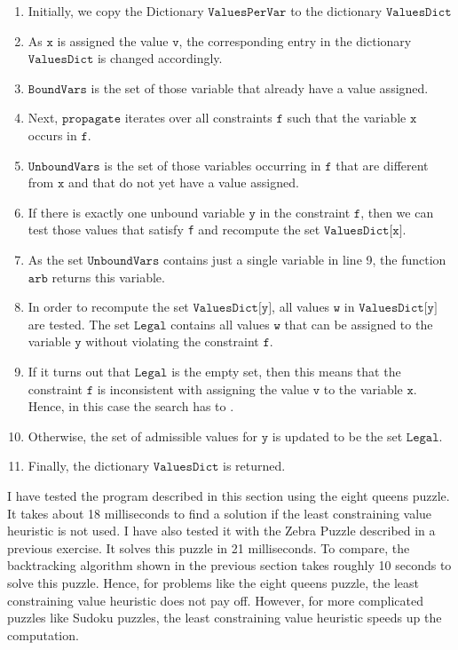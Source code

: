 \begin{enumerate}
\item Initially, we copy the Dictionary $\texttt{ValuesPerVar}$ to the dictionary
      $\mathtt{ValuesDict}$
\item As $\texttt{x}$ is assigned the value $\texttt{v}$, the corresponding entry in the dictionary
      $\texttt{ValuesDict}$ is changed accordingly. 
\item $\texttt{BoundVars}$ is the set of those variable that already have a value assigned.
\item Next, $\texttt{propagate}$ iterates over all  constraints $\texttt{f}$ such that the variable
      $\texttt{x}$ occurs in $\texttt{f}$.
\item $\texttt{UnboundVars}$ is the set of those variables occurring in $\texttt{f}$ that are different from
      $\texttt{x}$ and that do not yet have a value assigned.  
\item If there is exactly one unbound variable $\texttt{y}$ in the constraint $\texttt{f}$, then we can test
      those values that satisfy \texttt{f} and recompute the set $\texttt{ValuesDict[x]}$.
\item As the set $\texttt{UnboundVars}$ contains just a single variable in line 9,
      the function $\texttt{arb}$ returns this variable.
\item In order to recompute the set $\texttt{ValuesDict[y]}$,  all values $\texttt{w}$ in
      $\texttt{ValuesDict[y]}$ are tested.  The set $\texttt{Legal}$ contains all values $\texttt{w}$ that can
      be assigned to the variable $\texttt{y}$ without violating the constraint $\texttt{f}$.
\item If it turns out that $\texttt{Legal}$ is the empty set, then this means that the constraint
      $\texttt{f}$ is inconsistent with assigning the value $\texttt{v}$ to the variable
      $\texttt{x}$.  Hence, in this case the  search has to  .
\item Otherwise, the set of admissible values for $\texttt{y}$ is updated to be the set $\texttt{Legal}$.
\item Finally, the dictionary $\texttt{ValuesDict}$ is returned.
\end{enumerate}
I have tested the program described in this section using the eight queens puzzle.  It takes about
18 milliseconds to find a solution if the least constraining value heuristic is not used.  I have also tested
it with the Zebra Puzzle described in a previous exercise.  It solves this puzzle in 21 milliseconds.  To
compare, the backtracking algorithm shown in the previous section takes roughly 10 seconds to solve this
puzzle.  Hence, for problems like the eight queens puzzle, the least constraining value heuristic does not pay
off.  However, for more complicated puzzles like Sudoku puzzles, the least constraining value heuristic speeds
up the computation.



